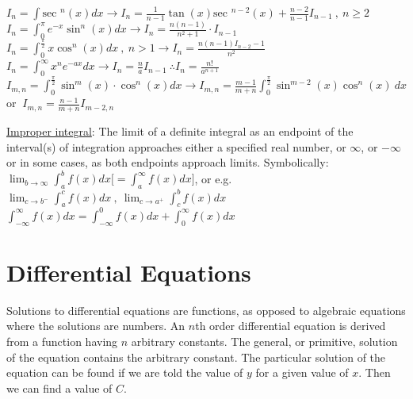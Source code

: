 \documentclass[12pt]{article}
\def\sec{\text{sec\ }} %
\begin{document}
\begin{flushleft}
	\textbullet \quad $\displaystyle I_n = \int \sec ^n(x) dx \rightarrow I_n = \frac{1}{n-1} \tan (x) \sec ^{n-2}(x) + \frac{n-2}{n-1} I_{n-1} \ , \ n\geq 2 $ \linebreak 
	\textbullet \quad $\displaystyle I_n = \int_0^{\pi} e^{-x} \sin ^n (x) dx \rightarrow I_n = \frac{n(n-1)}{n^2+ 1} \cdot I_{n-1} $ \linebreak 
	\textbullet \quad $\displaystyle I_n = \int_0^{\frac{\pi}{2}} x\cos ^n(x) dx \ , \ n>1 \rightarrow I_n = \frac{n(n-1)I_{n-2} - 1}{n^2} $ \linebreak 
	\textbullet \quad $\displaystyle I_n = \int_0^{\infty} x^n e^{-ax} dx \rightarrow I_n = \frac{n}{a} I_{n-1} \ \therefore I_n = \frac{n!}{a^{n+1}} $ \linebreak 
	\textbullet \quad $\displaystyle I_{m,n} = \int_0^{\frac{\pi}{2}} \sin ^m(x) \cdot \cos ^n(x) dx \rightarrow I_{m,n} = \frac{m-1}{m+n} \int_0^{\frac{\pi}{2}} \sin ^{m-2} (x) \cos ^n(x) \ dx $ or $ \ I_{m,n} = \frac{n-1}{m+n} I_{m-2, n} $ \linebreak 
	
	\uline{Improper integral}: The limit of a definite integral as an endpoint of the interval(s) of integration approaches either a specified real number, or $\infty$, or $-\infty$ or in some cases, as both endpoints approach limits. Symbolically: \linebreak 
	$\displaystyle \lim_{b\to \infty} \int_a^b f(x) dx \big[ = \int_a^{\infty} f(x) dx \big]$, or e.g.  \linebreak 
	$\displaystyle \lim_{c\to b^-} \int_a^c f(x) dx \ , \ \lim_{c\to a^+} \int_c^b f(x) dx$ \linebreak 
	$\displaystyle \int_{-\infty}^{\infty} f(x) dx = \int_{-\infty}^0 f(x) dx + \int_0^{\infty} f(x) dx$ \linebreak 
	
	
	\pagebreak
	
	
	\section{Differential Equations}

	\textbullet \quad Solutions to differential equations are functions, as opposed to algebraic equations where the solutions are numbers. \linebreak 
	\textbullet \quad An $n$th order differential equation is derived from a function having $n$ arbitrary constants. \linebreak 
	\textbullet \quad The general, or primitive, solution of the equation contains the arbitrary constant. \linebreak 
	\textbullet \quad The particular solution of the equation can be found if we are told the value of $y$ for a given value of $x$. Then we can find a value of $C$. \linebreak 


\end{flushleft}
\end{document}
